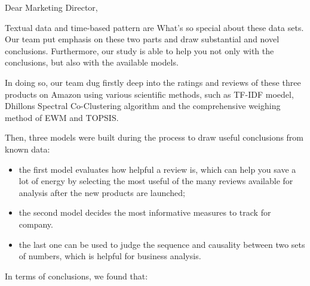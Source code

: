 \documentclass{mcmthesis}
\begin{document}
\maketitle

\setcounter{tocdepth}{2}
\tableofcontents
\newpage
\memodate{\today}
\begin{memo}
\noindent Dear Marketing Director,

Textual data and time-based pattern are What's so special about these data sets. Our team put emphasis on these two parts and draw substantial and novel conclusions. Furthermore, our study is able to help you not only with the conclusions, but also with the available models. 

In doing so, our team dug firstly deep into the ratings and reviews of these three products on Amazon using various scientific methods, such as TF-IDF moedel, Dhillons Spectral Co-Clustering algorithm and the comprehensive weighing method of EWM and TOPSIS. 

Then, three models were built during the process to draw useful conclusions from known data: 

 \begin{itemize}
\item the first model evaluates how helpful a review is, which can help you save a lot of energy by selecting the most useful of the many reviews available for analysis after the new products are launched;

\item the second model decides the most informative measures to track for company.

\item the last one can be used to judge the sequence and causality between two sets of numbers, which is helpful for business analysis.

\end{itemize}

In terms of conclusions, we found that:


\end{memo}
\end{document}
